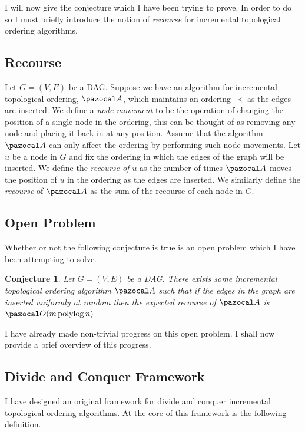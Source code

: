 \documentclass{article}
\newtheorem{conjecture}[theorem]{Conjecture}
\DeclareMathOperator*{\polylog}{polylog}
\begin{document}
I will now give the conjecture which I have been trying to prove. In order to do so I must briefly introduce the notion of \textit{recourse} for incremental topological ordering algorithms.

\subsection{Recourse}

Let $G=(V,E)$ be a DAG. Suppose we have an algorithm for incremental topological ordering, $\pazocal A$, which maintains an ordering $\prec$ as the edges are inserted. We define a \textit{node movement} to be the operation of changing the position of a single node in the ordering, this can be thought of as removing any node and placing it back in at any position. Assume that the algorithm $\pazocal A$ can only affect the ordering by performing such node movements. Let $u$ be a node in $G$ and fix the ordering in which the edges of the graph will be inserted. We define the \textit{recourse of $u$} as the number of times $\pazocal A$ moves the position of $u$ in the ordering as the edges are inserted. We similarly define the \textit{recourse} of $\pazocal A$ as the sum of the recourse of each node in $G$.

\subsection{Open Problem}

Whether or not the following conjecture is true is an open problem which I have been attempting to solve.

\begin{conjecture}\label{aimconj}
Let $G=(V,E)$ be a DAG. There exists some incremental topological ordering algorithm $\pazocal A$ such that if the edges in the graph are inserted uniformly at random then the expected recourse of $\pazocal A$ is $\pazocal O(m \polylog n)$
\end{conjecture}

I have already made non-trivial progress on this open problem. I shall now provide a brief overview of this progress.

\subsection{Divide and Conquer Framework}

I have designed an original framework for divide and conquer incremental topological ordering algorithms. At the core of this framework is the following definition.
\end{document}
